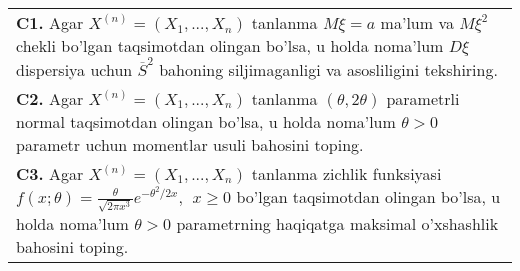 \documentclass{article}
\begin{document}
\begin{tabular}{m{17cm}}
\textbf{C1.} 
Agar \(X^{(n)} = \left( X_{1},...,X_{n} \right)\) tanlanma \(M\xi = a\) ma'lum va \(M\xi^{2}\) chekli bo'lgan taqsimotdan olingan bo'lsa, u holda noma'lum \(D\xi\) dispersiya uchun \({\overline{S}}^{2}\) bahoning siljimaganligi va asosliligini tekshiring.
\\
\textbf{C2.} 
Agar \(X^{(n)} = \left( X_{1},...,X_{n} \right)\) tanlanma \((\theta,2\theta)\) parametrli normal taqsimotdan olingan bo'lsa, u holda noma'lum \(\theta > 0\) parametr uchun momentlar usuli bahosini toping.
\\
\textbf{C3.} 
Agar \(X^{(n)} = \left( X_{1},...,X_{n} \right)\) tanlanma zichlik funksiyasi \(f(x;\theta) = \frac{\theta}{\sqrt{2\pi x^{3}}}e^{- \theta^{2}/2x},\ \ x \geq 0\) bo'lgan taqsimotdan olingan bo'lsa, u holda noma'lum \(\theta > 0\) parametrning haqiqatga maksimal o'xshashlik bahosini toping.
\\

\end{tabular}
\vspace{1cm}
\end{document}
